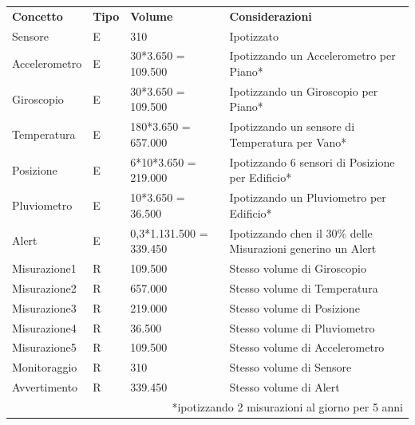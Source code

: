 \documentclass[12pt,a4paper]{report}
\begin{document}
\begin{center}
            \begin{tabular}{|p{4cm}|p{1cm}|p{3cm}|p{8cm}|}
                \hline
                \rowcolor{verde}\multicolumn{4}{|c|}{\textbf{Area Monitoraggio}} \\ \hline
                \textbf{Concetto} & \textbf{Tipo} & \textbf{Volume} & \textbf{Considerazioni} \\ \hline
                Sensore & E & 310 & Ipotizzato \\ \hline
                Accelerometro & E & 30*3.650 = 109.500 & Ipotizzando un Accelerometro per Piano* \\ \hline
                Giroscopio & E & 30*3.650 = 109.500 & Ipotizzando un Giroscopio per Piano* \\ \hline
                Temperatura & E & 180*3.650 = 657.000 & Ipotizzando un sensore di Temperatura per Vano* \\ \hline
                Posizione & E & 6*10*3.650 = 219.000 & Ipotizzando 6 sensori di Posizione per Edificio* \\ \hline
                Pluviometro & E & 10*3.650 = 36.500 & Ipotizzando un Pluviometro per Edificio* \\ \hline
                Alert & E & 0,3*1.131.500 = 339.450 & Ipotizzando chen il 30\% delle Misurazioni generino un Alert \\ \hline
                Misurazione1 & R & 109.500 & Stesso volume di Giroscopio \\ \hline
                Misurazione2 & R & 657.000 & Stesso volume di Temperatura \\ \hline
                Misurazione3 & R & 219.000 & Stesso volume di Posizione \\ \hline
                Misurazione4 & R & 36.500 & Stesso volume di Pluviometro \\ \hline
                Misurazione5 & R & 109.500 & Stesso volume di Accelerometro \\ \hline
                Monitoraggio & R & 310 & Stesso volume di Sensore \\ \hline
                Avvertimento & R & 339.450 & Stesso volume di Alert \\ \hline
                \multicolumn{4}{|r|}{*ipotizzando 2 misurazioni al giorno per 5 anni} \\ \hline
            \end{tabular}
            
        \end{center}
        
\end{document}
